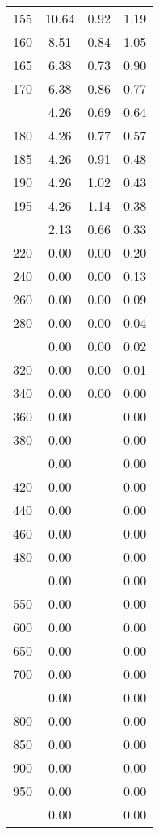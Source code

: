 \begin{table}[ht]
\begin{tabular}{lccc}
  155 & 10.64 & 0.92 & 1.19 \\ 
  160 & 8.51 & 0.84 & 1.05 \\ 
  165 & 6.38 & 0.73 & 0.90 \\ 
  170 & 6.38 & 0.86 & 0.77 \\ 
   \addlinespace
175 & 4.26 & 0.69 & 0.64 \\ 
  180 & 4.26 & 0.77 & 0.57 \\ 
  185 & 4.26 & 0.91 & 0.48 \\ 
  190 & 4.26 & 1.02 & 0.43 \\ 
  195 & 4.26 & 1.14 & 0.38 \\ 
   \addlinespace
200 & 2.13 & 0.66 & 0.33 \\ 
  220 & 0.00 & 0.00 & 0.20 \\ 
  240 & 0.00 & 0.00 & 0.13 \\ 
  260 & 0.00 & 0.00 & 0.09 \\ 
  280 & 0.00 & 0.00 & 0.04 \\ 
   \addlinespace
300 & 0.00 & 0.00 & 0.02 \\ 
  320 & 0.00 & 0.00 & 0.01 \\ 
  340 & 0.00 & 0.00 & 0.00 \\ 
  360 & 0.00 &  & 0.00 \\ 
  380 & 0.00 &  & 0.00 \\ 
   \addlinespace
400 & 0.00 &  & 0.00 \\ 
  420 & 0.00 &  & 0.00 \\ 
  440 & 0.00 &  & 0.00 \\ 
  460 & 0.00 &  & 0.00 \\ 
  480 & 0.00 &  & 0.00 \\ 
   \addlinespace
500 & 0.00 &  & 0.00 \\ 
  550 & 0.00 &  & 0.00 \\ 
  600 & 0.00 &  & 0.00 \\ 
  650 & 0.00 &  & 0.00 \\ 
  700 & 0.00 &  & 0.00 \\ 
   \addlinespace
750 & 0.00 &  & 0.00 \\ 
  800 & 0.00 &  & 0.00 \\ 
  850 & 0.00 &  & 0.00 \\ 
  900 & 0.00 &  & 0.00 \\ 
  950 & 0.00 &  & 0.00 \\ 
   \addlinespace
1000 & 0.00 &  & 0.00 \\ 
   \bottomrule
\end{tabular}
\end{table}

